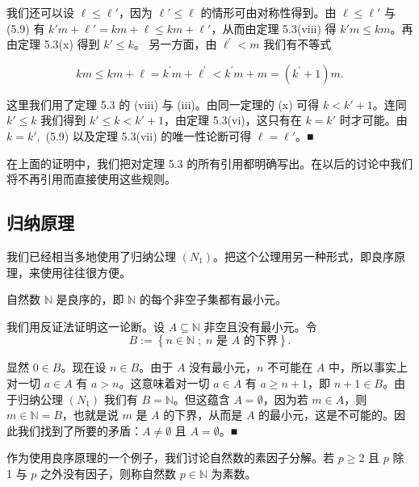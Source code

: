 \begin{proposition}
\begin{items}
我们还可以设 $\ell \leq \ell'$，因为 $\ell' \leq \ell$ 的情形可由对称性得到。由 $\ell \leq \ell'$ 与 (5.9) 有 $k'm + \ell' = km + \ell \leq km + \ell'$，从而由定理 5.3(viii) 得 $k'm \leq km$。再由定理 5.3(x) 得到 $k' \leq k$。
另一方面，由 $ \ell^{\prime}<m $ 我们有不等式

\[
km\leq km+\ell=k^{\prime}m+\ell^{\prime}<k^{\prime}m+m=(k^{\prime}+1)m.
\]

这里我们用了定理 5.3 的 (viii) 与 (iii)。由同一定理的 (x) 可得 $k < k' + 1$。连同 $k' \leq k$ 我们得到 $k' \leq k < k' + 1$，由定理 5.3(vi)，这只有在 $k = k'$ 时才可能。由 $k = k',$ (5.9) 以及定理 5.3(vii) 的唯一性论断可得 $\ell = \ell'$。■

\end{items}

\end{proposition}

在上面的证明中，我们把对定理 5.3 的所有引用都明确写出。在以后的讨论中我们将不再引用而直接使用这些规则。

\subsection*{归纳原理}

我们已经相当多地使用了归纳公理 $ (N_{1}) $。把这个公理用另一种形式，即良序原理，来使用往往很方便。

\begin{proposition}

自然数 $ \mathbb{N} $ 是良序的，即 $ \mathbb{N} $ 的每个非空子集都有最小元。

\proofhead
我们用反证法证明这一论断。设 $ A \subseteq \mathbb{N} $ 非空且没有最小元。令
\[
B:=\left\{n\in\mathbb{N}\;;\;n\text{ 是 }A\text{ 的下界}\right\}.
\]

显然 $0 \in B$。现在设 $n \in B$。由于 $A$ 没有最小元，$n$ 不可能在 $A$ 中，所以事实上对一切 $a \in A$ 有 $a > n$。这意味着对一切 $a \in A$ 有 $a \geq n + 1$，即 $n + 1 \in B$。由于归纳公理 $(N_1)$ 我们有 $B = \mathbb{N}$。但这蕴含 $A = \emptyset$，因为若 $m \in A$，则 $m \in \mathbb{N} = B$，也就是说 $m$ 是 $A$ 的下界，从而是 $A$ 的最小元，这是不可能的。因此我们找到了所要的矛盾：$A \neq \emptyset$ 且 $A = \emptyset$。■

\end{proposition}

作为使用良序原理的一个例子，我们讨论自然数的素因子分解。若 $ p \geq 2 $ 且 $ p $ 除 1 与 $ p $ 之外没有因子，则称自然数 $ p \in \mathbb{N} $ 为素数。

